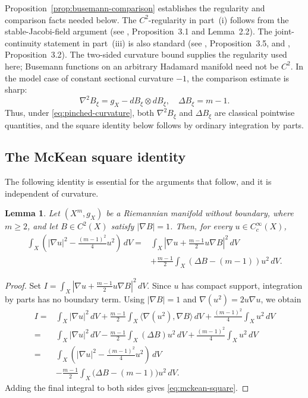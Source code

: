 \documentclass[12pt]{amsart}
\newtheorem{lemma}[theorem]{Lemma}
\theoremstyle{definition}
\numberwithin{equation}{section}
\begin{document}
Proposition~\ref{prop:busemann-comparison} establishes the regularity and
comparison facts needed below.  The \(C^2\)-regularity in part~\textup{(i)}
follows from the stable-Jacobi-field argument (see
\cite{HeintzeImHof1977}, Proposition~3.1 and Lemma~2.2).  The
joint-continuity statement in part~\textup{(iii)} is also standard
(see \cite{EberleinONeill1973}, Proposition~3.5, and
\cite{HeintzeImHof1977}, Proposition~3.2).  The two-sided curvature bound
supplies the regularity used here; Busemann functions on an arbitrary
Hadamard manifold need not be \(C^2\).  In the model case of constant
sectional curvature \(-1\), the comparison estimate is sharp:
\[
  \nabla^2B_\xi=g_X-dB_\xi\otimes dB_\xi,
  \quad
  \Delta B_\xi=m-1.
\]
Thus, under \eqref{eq:pinched-curvature}, both \(\nabla^2B_\xi\) and
\(\Delta B_\xi\) are classical pointwise quantities, and the square
identity below follows by ordinary integration by parts.

\subsection{The McKean square identity}
The following identity is essential for the arguments that follow, and it is independent of curvature.
\begin{lemma}
\label{lem:mckean-square}
Let \((X^m,g_X)\) be a Riemannian manifold without boundary, where
\(m\geq2\), and let \(B\in C^2(X)\) satisfy \(|\nabla B|=1\).  Then, for every
\(u\in C_c^\infty(X)\),
\begin{equation}\label{eq:mckean-square}
\begin{split}
  \int_X\left(|\nabla u|^2-\frac{(m-1)^2}{4}u^2\right)\,dV
  ={}&\int_X\left|\nabla u+\frac{m-1}{2}u\nabla B\right|^2\,dV \\
  &+\frac{m-1}{2}\int_X(\Delta B-(m-1))u^2\,dV.
\end{split}
\end{equation}
\end{lemma}

\begin{proof}
Set
\(
  I=\int_X|\nabla u+\frac{m-1}{2}u\nabla B|^2\,dV.
\)
Since \(u\) has compact support, integration by parts has no boundary
term.  Using \(|\nabla B|=1\) and
\(\nabla(u^2)=2u\nabla u\), we obtain
\begin{align*}
  I
  ={}&\int_X|\nabla u|^2\,dV
  +\frac{m-1}{2}\int_X
     \langle\nabla(u^2),\nabla B\rangle\,dV
  +\frac{(m-1)^2}{4}\int_Xu^2\,dV \\
  ={}&\int_X|\nabla u|^2\,dV
  -\frac{m-1}{2}\int_X(\Delta B)u^2\,dV
  +\frac{(m-1)^2}{4}\int_Xu^2\,dV \\
  ={}&\int_X\left(
    |\nabla u|^2-\frac{(m-1)^2}{4}u^2
  \right)\,dV \\
  &-\frac{m-1}{2}
  \int_X\bigl(\Delta B-(m-1)\bigr)u^2\,dV.
\end{align*}
Adding the final integral to both sides gives
\eqref{eq:mckean-square}.
\end{proof}
\end{document}
